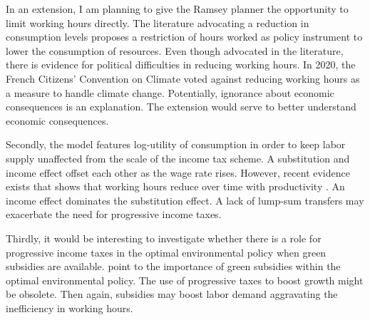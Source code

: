 In an extension, I am planning to give the Ramsey planner the opportunity to limit working hours directly. The literature advocating a reduction in consumption levels \citep[e.g.,][]{Schor2005SustainableReductionb} proposes a restriction of hours worked as policy instrument to lower the consumption of resources.
Even though advocated in the literature, there is evidence for political difficulties in reducing working hours. In 2020, the French Citizens' Convention on Climate voted against reducing working hours as a measure to handle climate change. Potentially, ignorance about economic consequences is an explanation. The extension would serve to better understand economic consequences. 

Secondly, the model features log-utility of consumption in order to keep labor supply unaffected from the scale of the income tax scheme. A substitution and income effect offset each other as the wage rate rises.  However, recent evidence exists that  shows that working hours reduce over time with productivity \citep{Boppart2019LaborPerspectiveb}. An income effect dominates the substitution effect. A lack of lump-sum transfers may exacerbate the need for progressive income taxes. 

Thirdly, it would be interesting to investigate whether there is a role for progressive income taxes in the optimal environmental policy when green subsidies are available. \cite{Acemoglu2012TheChange} point to the importance of green subsidies within the optimal environmental policy. The use of progressive taxes to boost growth might be obsolete. Then again, subsidies may boost labor demand aggravating the inefficiency in working hours. 
